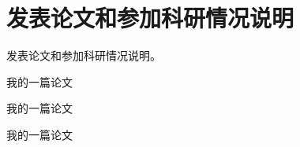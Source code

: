 \chapter{发表论文和参加科研情况说明}

发表论文和参加科研情况说明。
\begin{enumerate}[{[1]}]
    \item 我的一篇论文
    \item 我的一篇论文
    \item 我的一篇论文
\end{enumerate}
